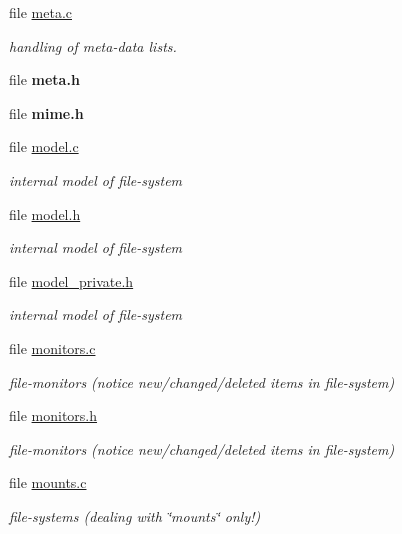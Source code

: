 \begin{CompactItemize}
\item 
file \hyperlink{meta_8c}{meta.c}
\begin{CompactList}\small\item\em handling of meta-data lists. \item\end{CompactList}

\item 
file {\bf meta.h}
\item 
file {\bf mime.h}
\item 
file \hyperlink{model_8c}{model.c}
\begin{CompactList}\small\item\em internal model of file-system \item\end{CompactList}

\item 
file \hyperlink{model_8h}{model.h}
\begin{CompactList}\small\item\em internal model of file-system \item\end{CompactList}

\item 
file \hyperlink{model__private_8h}{model\_\-private.h}
\begin{CompactList}\small\item\em internal model of file-system \item\end{CompactList}

\item 
file \hyperlink{monitors_8c}{monitors.c}
\begin{CompactList}\small\item\em file-monitors (notice new/changed/deleted items in file-system) \item\end{CompactList}

\item 
file \hyperlink{monitors_8h}{monitors.h}
\begin{CompactList}\small\item\em file-monitors (notice new/changed/deleted items in file-system) \item\end{CompactList}

\item 
file \hyperlink{mounts_8c}{mounts.c}
\begin{CompactList}\small\item\em file-systems (dealing with \char`\"{}mounts\char`\"{} only!) \item\end{CompactList}


\end{CompactItemize}
